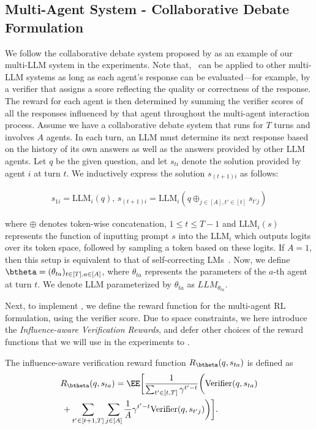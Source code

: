 \subsection{Multi-Agent System - Collaborative Debate Formulation}
{We follow the collaborative debate system proposed by \citet{du2023improving}as an example of our multi-LLM system in the experiments.}  Note that, \ourstwo~can be applied to other multi-LLM systems as long as each agent’s response can be evaluated—for example, by a verifier that assigns a score reflecting the quality or correctness of the response.  The reward for each agent is then determined by summing the verifier scores of all the responses influenced by that agent throughout the {multi-agent interaction} process.
Assume we have a collaborative debate system that runs for \( T \) turns and involves \( A \) agents.  In each turn, an LLM must determine its next response based on the history of its own answers as well as the answers provided by other LLM agents. Let \( q \) be the given question, and let \( s_{ti} \) denote the solution provided by agent \( i \) at turn \( t \).  We inductively express the solution \( s_{(t+1)i} \) as follows:
\safevspace{-0.3cm}

{\small
\begin{align*}
s_{1i} = \text{LLM}_i\left(q\right), \,
s_{(t+1)i} = \text{LLM}_i\left(q \oplus_{j \in [A], t' \in [t]} s_{t'j}\right)  
\end{align*}}
\safevspace{-5mm}

\noindent where \( \oplus \) denotes token-wise concatenation, $1 \leq t \leq T-1$ and \( \text{LLM}_i(s) \) represents the function of inputting {prompt}  \( s \) into the \( \text{LLM}_i \) {which outputs logits over its token space, followed by sampling a token based on these logits.} If $A = 1$, then this setup is equivalent to that of  self-correcting LMs~\cite{madaan2024self}. Now, we define \(\btheta = (\theta_{ta})_{t\in[T], a \in [A]}\), where \(\theta_{ta}\) represents the parameters of the \(a\)-th agent at turn \(t\). We denote LLM parameterized by  $\theta_{ta}$ as \(LLM_{\theta_{ta}}\).

Next, to implement \ourstwo, we define the reward function for the multi-agent RL formulation,   using the verifier score. {Due to space constraints, we here introduce the \textit{Influence-aware Verification Rewards}, and defer other choices of the reward functions that we will use in the experiments to .} 

\begin{definition}
\label{def:infl-veri}
The influence-aware verification reward function $R_{\btheta}(q, s_{ta})$ is defined as 
\begin{align*}
    &R_{\btheta}(q, s_{ta}) = \EE \bigg[\frac{1}{\sum_{t' \in [t, T]} \gamma^{t'-t}} \biggl( \text{Verifier}(q, s_{ta}) 
    \\
    &\, + \sum_{t' \in [t+1, T]}\sum_{j \in [A]} \frac{1}{A}\gamma^{t'-t}\text{Verifier}(q, s_{t'j})\biggr) \bigg].  
\end{align*}
\end{definition}

